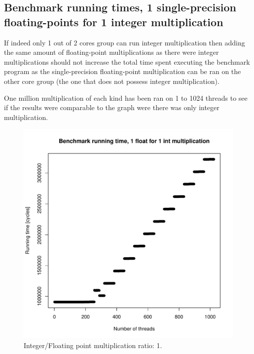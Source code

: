 \documentclass{article}
\def \scalingfactor{.8}
\begin{document}
	\subsection{Benchmark running times, 1 single-precision floating-points for 1 integer multiplication}
	If indeed only 1 out of 2 cores group can run integer multiplication then
    adding the same amount of floating-point multiplications as there were integer
    multiplications should not increase the total time spent executing the benchmark 
    program as the single-precision floating-point multiplication can
    be ran on the other core group (the one that does not possess integer multiplication).
	
	One million multiplication of each kind has been ran on 1 to 1024 threads to
    see if the results were comparable to the graph were there was only integer multiplication.
	\begin{figure}[h]
		\centering
		\vspace{-20pt}
    			\includegraphics[width=\scalingfactor\linewidth]{"graphics/running_times_ratio11"}
		\vspace{-15pt}
		\caption{Integer/Floating point multiplication ratio: 1.}
	\end{figure}
	\pagebreak
\end{document}
